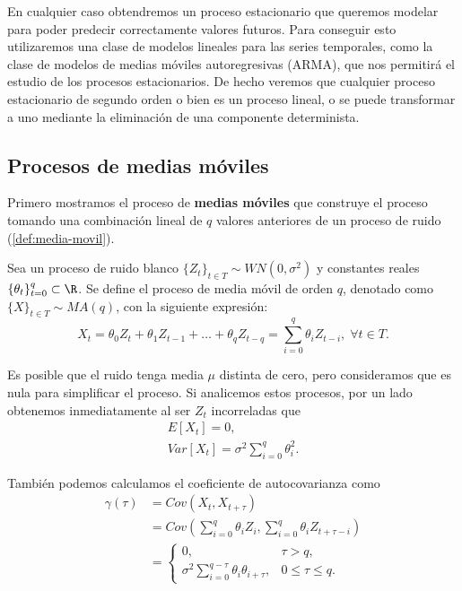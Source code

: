 En cualquier caso obtendremos un proceso estacionario que queremos modelar para poder predecir correctamente valores futuros. Para conseguir esto utilizaremos una clase de modelos lineales para las series temporales, como la clase de modelos de medias móviles autoregresivas (ARMA), que nos permitirá el estudio de los procesos estacionarios. De hecho veremos que cualquier proceso  estacionario de segundo orden o bien es un proceso lineal, o se puede transformar a uno mediante la eliminación de una componente determinista.

\subsection{Procesos de medias móviles}

Primero mostramos el proceso de \textbf{medias móviles} que construye el proceso tomando una combinación lineal de $q$ valores anteriores de un proceso de ruido (\autoref{def:media-movil}).

\begin{definicion}
  Sea un proceso de ruido blanco $\{Z_t\}_{t \in T} \sim WN(0, \sigma^2)$ y constantes reales $\{\theta_t\}_{t = 0}^q \subset \R$. Se define el proceso de media móvil de orden $q$, denotado como $\{X\}_{t \in T} \sim MA(q)$, con la siguiente expresión:
  $$X_t = \theta_0 Z_t + \theta_1 Z_{t - 1} + \ldots + \theta_q Z_{t - q} = \sum \limits^q_{i = 0} \theta_i Z_{t - i}, \; \forall t \in T.$$
  \label{def:media-movil}
\end{definicion}

Es posible que el ruido tenga media $\mu$ distinta de cero, pero consideramos que es nula para simplificar el proceso. Si analicemos estos procesos, por un lado obtenemos inmediatamente al ser $Z_t$ incorreladas que
\begin{gather}
  E[X_t] = 0, \\
  Var[X_t] = \sigma^2 \sum \limits^q_{i = 0} \theta_i^2.
  \label{eq:media-media-auto}
\end{gather}

También podemos calculamos el coeficiente de autocovarianza como
\begin{equation*}
  \begin{aligned}
    \gamma(\tau) & = Cov(X_t, X_{t + \tau}) \\
    & = Cov\left(\sum \limits^q_{i = 0} \theta_i Z_i, \sum \limits^q_{i = 0} \theta_i Z_{t + \tau - i}\right) \\
    & = \begin{cases}
      0, & \tau > q, \\
      \sigma^2 \sum \limits^{q - \tau}_{i = 0} \theta_i \theta_{i + \tau}, & 0 \leq \tau \leq q.
    \end{cases}
  \end{aligned}
\label{eq:media-coef-auto}
\end{equation*}

